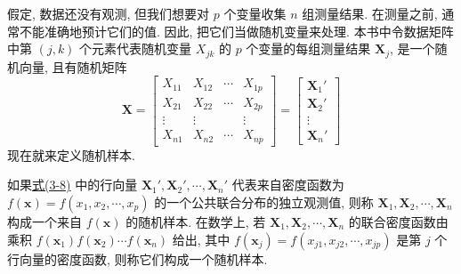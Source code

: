 假定, 数据还没有观测, 但我们想要对 $p$ 个变量收集 $n$ 组测量结果. 在测量之前, 通常不能准确地预计它们的值. 因此, 把它们当做随机变量来处理. 本书中令数据矩阵中第 $(j,k)$ 个元素代表随机变量 $X_{jk}$ 的 $p$ 个变量的每组测量结果 $\mathbf{X}_{j}$, 是一个随机向量, 且有随机矩阵
\label{eq:3-8}
\begin{equation}
\mathbf{X}=\begin{bmatrix}
X_{11}&X_{12}&\cdots&X_{1p}\\
X_{21}&X_{22}&\cdots&X_{2p}\\
\vdots&\vdots&&\vdots\\
X_{n1}&X_{n2}&\cdots&X_{np}
\end{bmatrix}
=\begin{bmatrix}\mathbf{X}_{1}'\\\mathbf{X}_{2}'\\\vdots\\\mathbf{X}_{n}'\end{bmatrix}
\tag{3-8}
\end{equation}
现在就来定义随机样本.

如果\hyperref[eq:3-8]{式(3-8)} 中的行向量 $\mathbf{X}_{1}',\mathbf{X}_{2}',\cdots,\mathbf{X}_{n}'$ 代表来自密度函数为 $f(\mathbf{x})=f(x_{1},x_{2},\cdots,x_{p})$ 的一个公共联合分布的独立观测值, 则称 $\mathbf{X}_{1},\mathbf{X}_{2},\cdots,\mathbf{X}_{n}$ 构成一个来自 $f(\mathbf{x})$ 的随机样本. 在数学上, 若 $\mathbf{X}_{1},\mathbf{X}_{2},\cdots,\mathbf{X}_{n}$ 的联合密度函数由乘积 $f(\mathbf{x}_{1})f(\mathbf{x}_{2})\cdots f(\mathbf{x}_{n})$ 给出, 其中 $f(\mathbf{x}_{j})=f(x_{j1},x_{j2},\cdots,x_{jp})$ 是第 $j$ 个行向量的密度函数, 则称它们构成一个随机样本.
